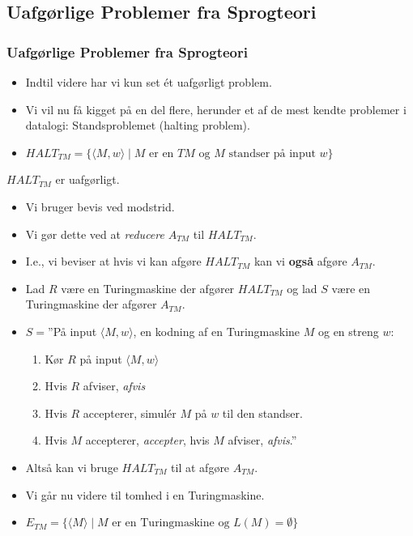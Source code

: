 \subsection{Uafgørlige Problemer fra Sprogteori}%
\label{subsec:uafgørligsprogteori}


\begin{frame}[allowframebreaks]
	\frametitle{Uafgørlige Problemer fra Sprogteori}
	\begin{itemize}
		\item Indtil videre har vi kun set ét uafgørligt problem.
		\item Vi vil nu få kigget på en del flere, herunder et af de mest kendte problemer i datalogi: Standsproblemet (halting problem).
		\item $HALT_{TM} = \{\langle M, w \rangle \mid M \text{ er en } TM \text{ og } M \text{ standser på input } w\}$
	\end{itemize}

	\begin{theorem}
		$HALT_{TM}$ er uafgørligt.
	\end{theorem}

	\begin{itemize}
		\item Vi bruger bevis ved modstrid.
		\item Vi gør dette ved at \textit{reducere} $A_{TM}$ til $HALT_{TM}$.
		\item I.e., vi beviser at hvis vi kan afgøre $HALT_{TM}$ kan vi \textbf{også} afgøre $A_{TM}$.
		\item Lad $R$ være en Turingmaskine der afgører $HALT_{TM}$ og lad $S$ være en Turingmaskine der afgører $A_{TM}$.
		\item $S = $''På input \(\langle M , w \rangle \), en kodning af en Turingmaskine $M$ og en streng $w$:
		      \begin{enumerate}
			      \item Kør $R$ på input \(\langle M , w \rangle\)
			      \item Hvis $R$ afviser, \textit{afvis}
			      \item Hvis $R$ accepterer, simulér $M$ på $w$ til den standser.
			      \item Hvis $M$ accepterer, \textit{accepter}, hvis $M$ afviser, \textit{afvis}.''
		      \end{enumerate}
		\item Altså kan vi bruge $HALT_{TM}$ til at afgøre $A_{TM}$.
		\item Vi går nu videre til tomhed i en Turingmaskine.
		\item $E_{TM} = \{\langle M \rangle \mid M \text{ er en Turingmaskine og }L(M) = \emptyset\}$
	\end{itemize}


\end{frame}
